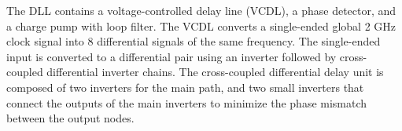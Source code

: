 \documentclass[graybox]{svmult}
\begin{document}
The DLL contains a voltage-controlled delay line (VCDL), a phase detector, and a charge pump with loop filter.
The VCDL converts a single-ended global 2 GHz clock signal into 8 differential signals of the same frequency.
The single-ended input is converted to a differential pair using an inverter followed by cross-coupled differential inverter chains.
The cross-coupled differential delay unit is composed of two inverters for the main path, and two small inverters that connect the outputs of the main inverters to minimize the phase mismatch between the output nodes.

\end{document}

